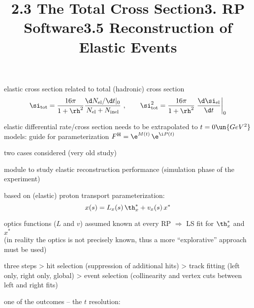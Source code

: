 \newpage%
\title{2.3 The Total Cross Section}




\> elastic cross section related to total (hadronic) cross section
$$
	\si_{\rm tot} = {16\pi\over 1+\rh^2} {\d N_{\rm el}/\d t |_0 \over N_{\rm el} + N_{\rm inel}}\ ,\qquad
	\si_{\rm tot}^2 = {16\pi\over 1+\rh^2} \left. {\d\si_{\rm el}\over\d t} \right|_0
$$

\> elastic differential rate/cross section needs to be extrapolated to $t=0\un{GeV^2}$
\> models: guide for parameterization $F^{\rm H} = \e^{M(t)}\, \e^{\i P(t)}$

\> two cases considered (very old study)


\newpage%
\title{3. RP Software\hfill 3.5 Reconstruction of Elastic Events}

\> module to study elastic reconstruction performance (simulation phase of the experiment)

\> based on (elastic) proton transport parameterization:
$$x(s) = L_x(s)\,\th_x^* + v_x(s)\,x^*$$

\> optics functions ($L$ and $v$) assumed known at every RP $\Rightarrow$ LS fit for $\th_x^*$ and $x^*$\\
(in reality the optics is not precisely known, thus a more ``explorative'' approach must be used)

\> three steps
\>> hit selection (suppression of additional hits)
\>> track fitting (left only, right only, global)
\>> event selection (collinearity and vertex cuts between left and right fits)

\> one of the outcomes -- the $t$ resolution:

